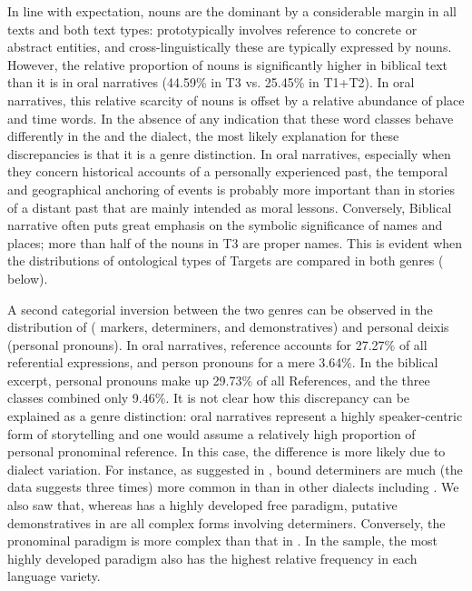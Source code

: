 \documentclass[output=paper
,modfonts
,nonflat]{langsci/langscibook}
\begin{document}
In line with expectation, nouns are the dominant  by a considerable margin in all texts and both text types:  prototypically involves reference to concrete or abstract entities, and cross-linguistically these are typically expressed by nouns. However, the relative proportion of nouns is significantly higher in biblical text than it is in oral narratives (44.59\% in T3 vs. 25.45\% in T1+T2). In oral narratives, this relative scarcity of nouns is offset by a relative abundance of place and time words. In the absence of any indication that these word classes behave differently in the  and the  dialect, the most likely explanation for these discrepancies is that it is a genre distinction. In oral narratives, especially when they concern historical accounts of a personally experienced past, the temporal and geographical anchoring of events is probably more important than in stories of a distant past that are mainly intended as moral lessons. Conversely, Biblical narrative often puts great emphasis on the symbolic significance of names and places; more than half of the nouns in T3 are proper names. This is evident when the distributions of ontological types of Targets are compared in both genres ( below).

A second categorial inversion between the two genres can be observed in the distribution of  ( markers, determiners, and demonstratives) and personal deixis (personal pronouns). In oral narratives,  reference accounts for 27.27\% of all referential expressions, and person pronouns for a mere 3.64\%. In the biblical excerpt, personal pronouns make up 29.73\% of all References, and the three  classes combined only 9.46\%. It is not clear how this discrepancy can be explained as a genre distinction: oral narratives represent a highly speaker-centric form of storytelling and one would assume a relatively high proportion of personal pronominal reference. In this case, the difference is more likely due to dialect variation. For instance, as suggested in , bound determiners are much (the data suggests three times) more common in  than in other dialects including . We also saw that, whereas  has a highly developed free  paradigm, putative demonstratives in  are all complex forms involving  determiners. Conversely, the  pronominal paradigm is more complex than that in . In the sample, the most highly developed  paradigm also has the highest relative frequency in each language variety.
\end{document}
